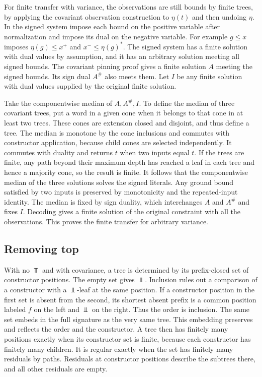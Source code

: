 For finite transfer with variance, the observations are still bounds
by finite trees, by applying the covariant observation construction
to $\eta(t)$ and then undoing $\eta$. In the signed system impose
each bound on the positive variable after normalization and impose
its dual on the negative variable. For example $g\le x$ imposes
$\eta(g)\le x^+$ and $x^-\le\eta(g)^*$. The signed system has a
finite solution with dual values by assumption, and it has an
arbitrary solution meeting all signed bounds. The covariant
pinning proof gives a finite solution $A$ meeting the signed
bounds. Its sign dual $A^\#$ also meets them. Let $I$ be
any finite solution with dual values supplied by the original
finite solution.

Take the componentwise median of $A,A^\#,I$. To define the
median of three covariant trees, put a word in a given cone
when it belongs to that cone in at least two trees. These
cones are extension closed and disjoint, and thus define a
tree. The median is monotone by the cone inclusions and
commutes with constructor application, because child cones
are selected independently. It commutes with duality and
returns $t$ when two inputs equal $t$. If the trees are
finite, any path beyond their maximum depth has reached a
leaf in each tree and hence a majority cone, so the result
is finite. It follows that the componentwise median of
the three solutions solves the signed literals. Any ground
bound satisfied by two inputs is preserved by monotonicity
and the repeated-input identity. The median is fixed by
sign duality, which interchanges $A$ and $A^\#$ and fixes
$I$. Decoding gives a finite solution of the original
constraint with all the observations. This proves the
finite transfer for arbitrary variance.

\subsection{Removing top}

With no $\Top$ and with covariance, a tree is determined by its
prefix-closed set of constructor positions. The empty set gives
$\Bot$. Inclusion rules out a comparison of a constructor
with a $\Bot$-leaf at the same position. If a constructor position
in the first set is absent from the second, its shortest absent
prefix is a common position labeled $f$ on the left and $\Bot$ on
the right. Thus the order is inclusion. The same set
embeds in the full signature as the very same tree. This embedding
preserves and reflects the order and the constructor. A tree
then has finitely many positions exactly when its constructor
set is finite, because each constructor has finitely many
children. It is regular exactly when the set has finitely many
residuals by paths. Residuals at constructor positions describe
the subtrees there, and all other residuals are empty.

